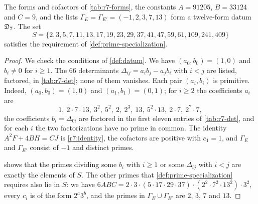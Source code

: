 \begin{lemma}\label{lem:r7-datum}
The forms and cofactors of \cref{tab:r7-forms}, the constants $A=91205$,
$B=33124$ and $C=9$, and the lists $\Gamma_E=\Gamma_{E'}=(-1,2,3,7,13)$ form
a twelve-form datum $\mathfrak D_7$. The set
\begin{equation}\label{r7:S}
 S=\{2,3,5,7,11,13,17,19,23,29,37,41,47,59,61,109,241,409\}
\end{equation}
satisfies the requirement of \cref{def:prime-specialization}.
\end{lemma}

\begin{proof}
We check the conditions of \cref{def:datum}. We have $(a_0,b_0)=(1,0)$ and
$b_i\ne0$ for $i\ge1$. The $66$ determinants
$\Delta_{ij}=a_ib_j-a_jb_i$ with $i<j$ are listed, factored, in
\cref{tab:r7-det}; none of them vanishes. Each pair $(a_i,b_i)$ is
primitive. Indeed, $(a_0,b_0)=(1,0)$ and $(a_1,b_1)=(0,1)$; for $i\ge2$ the
coefficients $a_i$ are
\[
 1,\ 2\cdot7\cdot13,\ 3^2,\ 5^2,\ 2,\ 2^3,\ 13,\ 5^2\cdot13,\ 2\cdot7,\
 2^7\cdot7,
\]
the coefficients $b_i=\Delta_{0i}$ are factored in the first eleven entries
of \cref{tab:r7-det}, and for each $i$ the two factorizations have no prime
in common. The identity $A^2F+4BH=CJ$ is \eqref{r7:identity}, the
cofactors are positive with $c_1=1$, and $\Gamma_E$ and $\Gamma_{E'}$
consist of $-1$ and distinct primes.

 shows that the primes dividing some $b_i$ with $i\ge1$ or some
$\Delta_{ij}$ with $i<j$ are exactly the elements of $S$. The other primes
that \cref{def:prime-specialization} requires also lie in $S$: we have
$6ABC=2\cdot3\cdot(5\cdot17\cdot29\cdot37)\cdot(2^2\cdot7^2\cdot13^2)\cdot3^2$,
every $c_i$ is of the form $2^a3^b$, and the primes in
$\Gamma_E\cup\Gamma_{E'}$ are $2$, $3$, $7$ and $13$.
\end{proof}

